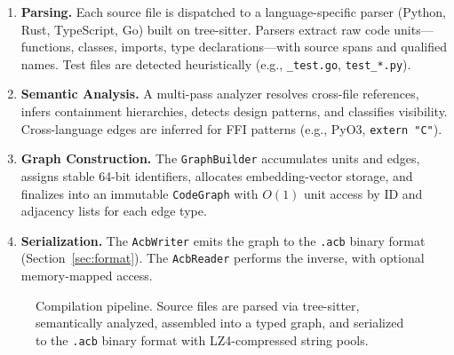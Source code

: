 \documentclass[10pt, twocolumn]{article}
\newcommand{\acbfile}{\texttt{.acb}\xspace}
\begin{document}
\begin{enumerate}[leftmargin=*, itemsep=2pt]
\item \textbf{Parsing.} Each source file is dispatched to a language-specific parser (Python, Rust, TypeScript, Go) built on tree-sitter. Parsers extract raw code units---functions, classes, imports, type declarations---with source spans and qualified names. Test files are detected heuristically (e.g., \texttt{\_test.go}, \texttt{test\_*.py}).

\item \textbf{Semantic Analysis.} A multi-pass analyzer resolves cross-file references, infers containment hierarchies, detects design patterns, and classifies visibility. Cross-language edges are inferred for FFI patterns (e.g., PyO3, \texttt{extern "C"}).

\item \textbf{Graph Construction.} The \texttt{GraphBuilder} accumulates units and edges, assigns stable 64-bit identifiers, allocates embedding-vector storage, and finalizes into an immutable \texttt{CodeGraph} with $O(1)$ unit access by ID and adjacency lists for each edge type.

\item \textbf{Serialization.} The \texttt{AcbWriter} emits the graph to the \acbfile binary format (Section~\ref{sec:format}). The \texttt{AcbReader} performs the inverse, with optional memory-mapped access.
\end{enumerate}

\begin{figure}[t]
\centering
{}
\caption{Compilation pipeline. Source files are parsed via tree-sitter, semantically analyzed, assembled into a typed graph, and serialized to the \acbfile binary format with LZ4-compressed string pools.}
\label{fig:pipeline}
\end{figure}
\end{document}
